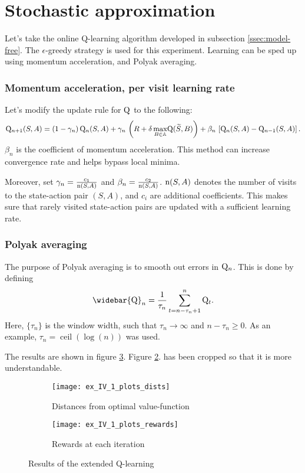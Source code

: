 \section{Stochastic approximation}

Let's take the online Q-learning algorithm developed in subsection \ref{ssec:model-free}.
The $\epsilon$-greedy strategy is used for this experiment.
Learning can be sped up using momentum acceleration, and Polyak averaging.

\subsubsection*{Momentum acceleration, per visit learning rate}

Let's modify the update rule for $\mathrm{Q}$ to the following:
\begin{equation}
	\mathrm{Q}_{n+1}(S, A) = (1 - \gamma_n)\,\mathrm{Q}_n(S, A) +
		\gamma_n\,\left(R + \delta\,\underset{B\in\mathbb{A}}{\max}\mathrm{Q}(\widetilde{S}, B)\right) +
		\beta_n\,\left[\mathrm{Q}_n(S, A) - \mathrm{Q}_{n-1}(S, A)\right].
\end{equation}
$\beta_n$ is the coefficient of momentum acceleration. This method can increase convergence rate
and helps bypass local minima.

Moreover, set $\gamma_n = \frac{c_1}{\mathrm{n}(S, A)}$ and $\beta_n = \frac{c_2}{\mathrm{n}(S, A)}$.
$\mathrm{n}(S, A)$ denotes the number of visits to the state-action pair $(S, A)$, and $c_i$ are additional
coefficients.
This makes sure that rarely visited state-action pairs are updated with a sufficient learning rate.

\subsubsection*{Polyak averaging}

The purpose of Polyak averaging is to smooth out errors in $\mathrm{Q}_n$.
This is done by defining
\begin{equation}
	\widebar{\fn{Q}}_n = \frac{1}{\tau_n}\sum\limits_{t=n-\tau_n+1}^n\fn{Q}_t.
\end{equation}
Here, $\{\tau_n\}$ is the window width, such that $\tau_n\rightarrow\infty$ and $n-\tau_n\geq 0 $.
As an example, $\tau_n = \operatorname{ceil}(\log(n))$ was used.

The results are shown in figure \ref{fig:extension}.
Figure \ref{fig:IV-rew}. has been cropped so that it is more understandable.

\begin{figure}[H]
	\centering
	\begin{subfigure}{.46\textwidth}
		\centering
		\texttt{[image: ex\_IV\_1\_plots\_dists]}
		\caption{Distances from optimal value-function}
		\label{}
	\end{subfigure}\hfill
	\begin{subfigure}{.46\textwidth}
		\centering
		\texttt{[image: ex\_IV\_1\_plots\_rewards]}
		\caption{Rewards at each iteration}
		\label{fig:IV-rew}
	\end{subfigure}
	\caption{Results of the extended Q-learning}
	\label{fig:extension}
\end{figure}
